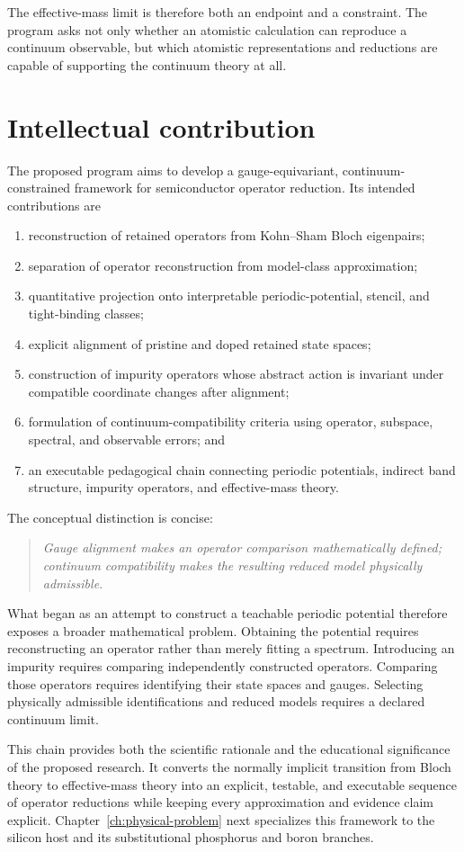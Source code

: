The effective-mass limit is therefore both an endpoint and a constraint. The
program asks not only whether an atomistic calculation can reproduce a
continuum observable, but which atomistic representations and reductions are
capable of supporting the continuum theory at all.

\section{Intellectual contribution}

The proposed program aims to develop a gauge-equivariant,
continuum-constrained framework for semiconductor operator reduction. Its
intended contributions are
\begin{enumerate}
    \item reconstruction of retained operators from Kohn--Sham Bloch
          eigenpairs;
    \item separation of operator reconstruction from model-class
          approximation;
    \item quantitative projection onto interpretable periodic-potential,
          stencil, and tight-binding classes;
    \item explicit alignment of pristine and doped retained state spaces;
    \item construction of impurity operators whose abstract action is invariant
          under compatible coordinate changes after alignment;
    \item formulation of continuum-compatibility criteria using operator,
          subspace, spectral, and observable errors; and
    \item an executable pedagogical chain connecting periodic potentials,
          indirect band structure, impurity operators, and effective-mass
          theory.
\end{enumerate}

The conceptual distinction is concise:
\begin{quote}
\itshape
Gauge alignment makes an operator comparison mathematically defined;
continuum compatibility makes the resulting reduced model physically
admissible.
\end{quote}

What began as an attempt to construct a teachable periodic potential therefore
exposes a broader mathematical problem. Obtaining the potential requires
reconstructing an operator rather than merely fitting a spectrum. Introducing
an impurity requires comparing independently constructed operators. Comparing
those operators requires identifying their state spaces and gauges. Selecting
physically admissible identifications and reduced models requires a declared
continuum limit.

This chain provides both the scientific rationale and the educational
significance of the proposed research. It converts the normally implicit
transition from Bloch theory to effective-mass theory into an explicit,
testable, and executable sequence of operator reductions while keeping every
approximation and evidence claim explicit. Chapter~\ref{ch:physical-problem}
next specializes this framework to the silicon host and its substitutional
phosphorus and boron branches.
